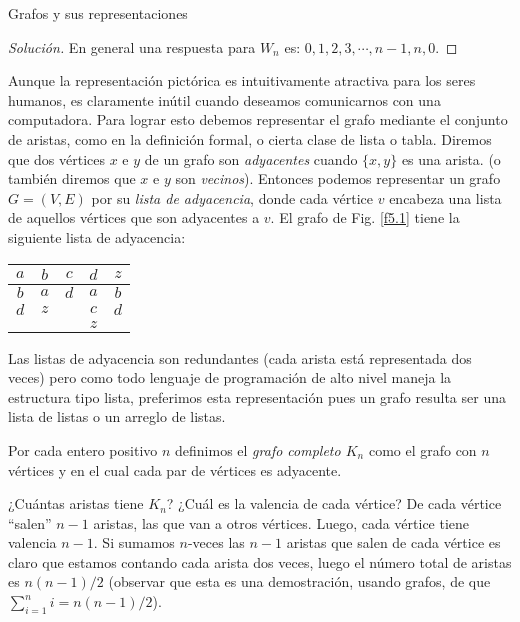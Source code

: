 \begin{section}{Grafos y sus representaciones}
\begin{proof}[Solución]
        En  general una respuesta para $W_n$ es: $0,1,2,3,\cdots,n-1,n,0$.   
\end{proof}

Aunque la representación pictórica es intuitivamente atractiva para los seres humanos, es claramente inútil cuando deseamos comunicarnos con una computadora. Para lograr esto debemos re\-pre\-sen\-tar el grafo mediante el conjunto de aristas, como en la definición formal, o cierta clase de lista o tabla. Diremos que dos vértices $x$ e $y$ de un grafo son \textit{adyacentes} cuando $\{x,y\}$ es una arista.  (o también diremos que $x$ e $y$ son \textit{vecinos}).  Entonces podemos representar un grafo $G=(V,E)$ por su \textit{lista de adyacencia},   donde cada vértice $v$ encabeza una lista de aquellos vértices que son adyacentes a $v$. El grafo de Fig. \ref{f5.1} tiene la siguiente lista de adyacencia:

\begin{center}
\begin{tabular}{ccccc}
$a$&$b$&$c$&$d$&$z$ \\ \hline
$b$&$a$&$d$&$a$&$b$ \\
$d$&$z$&&$c$&$d$\\
&&&$z$&
\end{tabular}
\end{center}

Las listas de adyacencia son redundantes (cada arista está representada dos veces) pero como todo lenguaje de programación de alto nivel maneja la estructura tipo lista,  preferimos esta representación pues  un grafo  resulta ser una lista de listas  o un  arreglo de listas.  


\begin{definicion}
Por cada entero positivo $n$ definimos el \textit{grafo completo   $K_n$} como el grafo con $n$ vértices y en el cual cada par de vértices es adyacente. 
\end{definicion}


¿Cuántas aristas tiene $K_n$? ¿Cuál es la valencia de cada vértice? De cada vértice ``salen'' $n-1$ aristas, las que van a otros vértices. Luego, cada vértice tiene valencia $n-1$. Si  sumamos $n$-veces las $n-1$ aristas que salen de cada vértice es claro que estamos contando cada arista dos veces, luego el número total de aristas es $n(n-1)/2$ (observar que esta es una demostración, usando  grafos, de que $\sum_{i=1}^n i = n(n-1)/2$).



\end{section}
